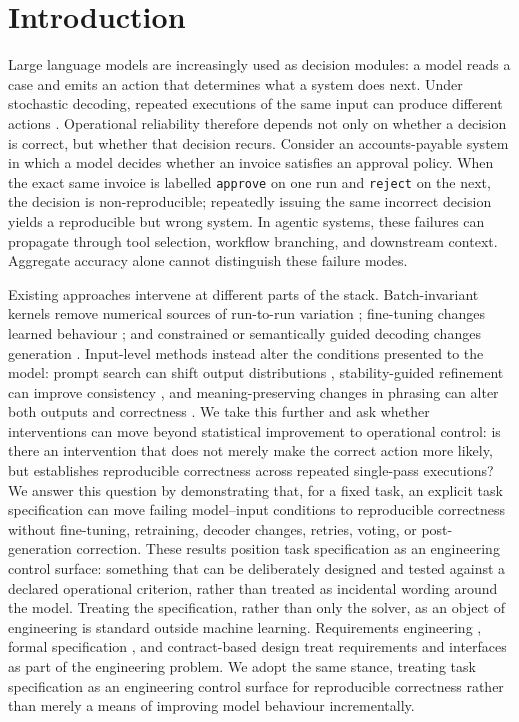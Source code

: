 \section{Introduction}
\label{sec:intro}

Large language models are increasingly used as decision modules: a model reads a
case and emits an action that determines what a system does next. Under stochastic
decoding, repeated executions of the same input can produce different actions
\citep{Ouyang_2025,atil2025nondeterminismdeterministicllmsettings}. Operational
reliability therefore depends not only on whether a decision is correct, but whether
that decision recurs. Consider an accounts-payable system in which a model decides whether an invoice satisfies an approval policy. When the exact same invoice is labelled \texttt{approve} on one run and \texttt{reject} on the next, the decision is non-reproducible; repeatedly issuing the
same incorrect decision yields a reproducible but wrong system. In agentic systems, these failures can propagate through tool selection, workflow branching, and downstream context. Aggregate accuracy alone cannot distinguish these failure modes.

Existing approaches intervene at different parts of the stack. Batch-invariant kernels remove numerical sources of run-to-run variation
\citep{he2025nondeterminism}; fine-tuning changes learned behaviour
\citep{tian2023finetuninglanguagemodelsfactuality}; and constrained or
semantically guided decoding changes generation
\citep{loula2025syntactic,ahmed2025semanticprobabilisticcontrollanguage}.
Input-level methods instead alter the conditions presented to the model: prompt
search can shift output distributions
\citep{bhargava2024whatsmagicwordcontrol}, stability-guided refinement can improve
consistency \citep{chen2025stability}, and meaning-preserving changes in phrasing can alter both outputs and correctness
\citep{mizrahi-etal-2024-state,srikanth2024errorsnaturallanguagereasoning}. We take this further and ask whether interventions can move beyond statistical improvement to operational control: is there an intervention that does not merely make the correct action more likely, but establishes reproducible correctness across repeated single-pass executions? We answer this question by demonstrating that, for a fixed task, an explicit task specification can move failing model--input conditions to reproducible correctness without fine-tuning, retraining, decoder changes, retries, voting, or post-generation correction. These results position task specification as an engineering control surface: something that can be deliberately designed and tested against a declared
operational criterion, rather than treated as incidental wording around the model. Treating the specification, rather than only the solver, as an object of engineering
is standard outside machine learning. Requirements engineering
\citep{vanlamsweerde2009requirements}, formal specification
\citep{lamport2002specifying}, and contract-based design
\citep{meyer1992contract} treat requirements and interfaces as part of the
engineering problem. We adopt the same stance, treating task specification as an
engineering control surface for reproducible correctness rather than merely a means
of improving model behaviour incrementally.

